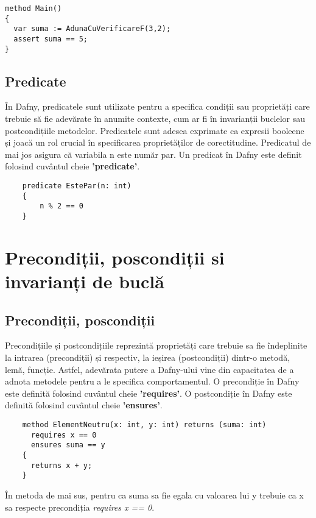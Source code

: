 \begin{verbatim}
method Main()
{
  var suma := AdunaCuVerificareF(3,2);
  assert suma == 5;
}
\end{verbatim}
\subsection{Predicate}
În Dafny, predicatele sunt utilizate pentru a specifica condiții sau proprietăți care trebuie să fie adevărate în anumite contexte, cum ar fi în invarianții buclelor sau postcondițiile metodelor. Predicatele sunt adesea exprimate ca expresii booleene și joacă un rol crucial în specificarea proprietăților de corectitudine. Predicatul de mai jos asigura că variabila n este număr par. Un predicat în Dafny este definit folosind cuvântul cheie \textbf{'predicate'}.
\begin{verbatim}
    predicate EstePar(n: int)
    {
        n % 2 == 0
    }
\end{verbatim}

\section{Precondiții, poscondiții si invarianți de buclă}
\subsection{Precondiții, poscondiții}

Precondițiile și postcondițiile reprezintă proprietăți care trebuie sa fie îndeplinite la intrarea (precondiții) și respectiv, la ieșirea (postcondiții) dintr-o metodă, lemă, funcție. Astfel, adevărata putere a Dafny-ului vine din capacitatea de a adnota metodele pentru a le specifica comportamentul. O precondiție în Dafny este definită folosind cuvântul cheie \textbf{'requires'}. O postcondiție în Dafny este definită folosind cuvântul cheie \textbf{'ensures'}.

\begin{verbatim}
    method ElementNeutru(x: int, y: int) returns (suma: int)
      requires x == 0
      ensures suma == y
    {
      returns x + y;
    }
\end{verbatim}
În metoda de mai sus, pentru ca suma sa fie egala cu valoarea lui y trebuie ca x sa respecte precondiția \textit{requires x == 0}. 

